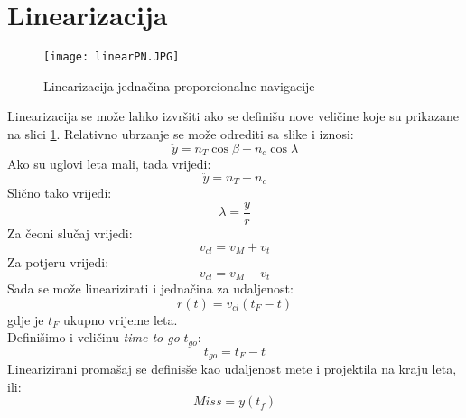 \section{Linearizacija}
\begin{figure}[h!]
    \centering
    \texttt{[image: linearPN.JPG]}
    \caption{Linearizacija jednačina proporcionalne navigacije}
    \label{fig:linear}
\end{figure}
\noindent Linearizacija se može lahko izvršiti ako se definišu nove veličine koje su prikazane na slici \ref{fig:linear}.
Relativno ubrzanje se može odrediti sa slike i iznosi:
\begin{equation}
    \ddot{y}=n_T\cos\beta-n_c\cos\lambda
\end{equation}
Ako su uglovi leta mali, tada vrijedi:
\begin{equation}
    \ddot{y}=n_T-n_c
\end{equation}
Slično tako vrijedi:
\begin{equation}
    \lambda = \frac{y}{r}
\end{equation}
Za čeoni slučaj vrijedi:
\begin{equation}
    v_{cl}=v_M+v_t
\end{equation}
Za potjeru vrijedi:
\begin{equation}
    v_{cl}=v_M-v_t
\end{equation}
Sada se može linearizirati i jednačina za udaljenost:
\begin{equation}
    r(t)=v_{cl}(t_F-t)
\end{equation}
gdje je $t_F$ ukupno vrijeme leta.\\
Definišimo i veličinu \textit{time to go} $t_{go}$:
\begin{equation}
    t_{go}=t_F-t
\end{equation}
Linearizirani promašaj se definisše kao udaljenost mete i projektila na kraju leta, ili:
\begin{equation}
    Miss=y(t_f)
\end{equation}
